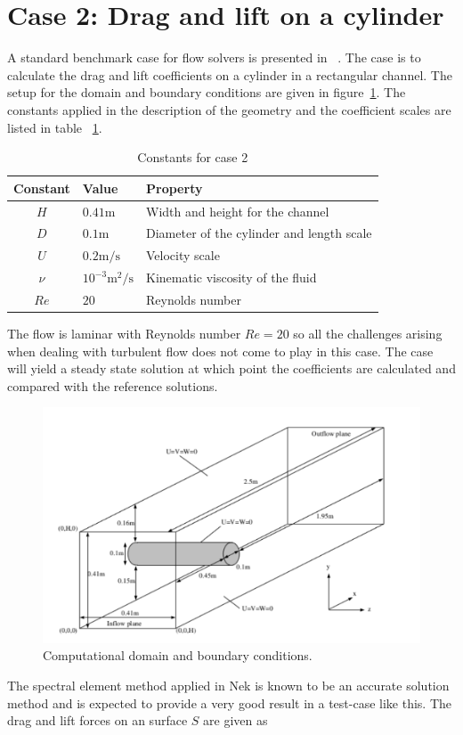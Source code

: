 \section{Case 2: Drag and lift on a cylinder}
A standard benchmark case for flow solvers is presented in ~\cite{benchmark}.
The case is to calculate the drag and lift coefficients on a cylinder in a rectangular channel.
The setup for the domain and boundary conditions are given in figure~\ref{fig:cylinder}.
The constants applied in the description of the geometry and the coefficient scales are listed 
in table ~\ref{tab:case2consts}.
%
\begin{table}[h]
    \centering
    \begin{tabular}{c l l}
     Constant & Value & Property \\ \hline
    $H$ & $0.41\text{m}$ & Width and height for the channel \\
    $D$ & $0.1\text{m}$ & Diameter of the cylinder and length scale \\
    $U$ & $0.2\text{m/s}$ & Velocity scale \\
    $\nu$ &  $ 10^{-3}\text{m$^2$/s}$ & Kinematic viscosity of the fluid \\
    $Re$ & $20$ & Reynolds number \\ 
    \end{tabular}
    \caption{Constants for case 2}
    \label{tab:case2consts}
\end{table}
%
The flow is laminar with Reynolds number $Re=20$ so all the 
challenges arising when dealing with turbulent flow does not come to play in this case. 
The case will yield a steady state solution at which point the coefficients are calculated
and compared with the reference solutions.
\begin{figure}[h]
    \centering
    \includegraphics[width = 1.0\textwidth]{Figures/cylinder.pdf}
    \caption{Computational domain and boundary conditions.}
    \label{fig:cylinder}
\end{figure}
The spectral element method applied in Nek is known to be an accurate
solution method and is expected to 
provide a very good result in a test-case like this.
The drag and lift forces on an surface $S$ are given as 

